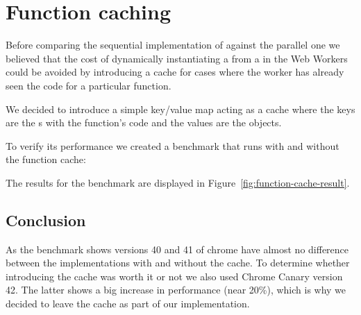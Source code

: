 \section{Function caching}

Before comparing the sequential implementation of  against the parallel one we believed that the cost of dynamically instantiating a \tfunction{} from a \tstring{} in the Web Workers could be avoided by introducing a cache for cases where the worker has already seen the code for a particular function.

We decided to introduce a simple key/value map acting as a cache where the keys are the \tstring{}s with the function's code and the values are the \tfunction{} objects.

To verify its performance we created a benchmark that runs with and without the function cache:

The results for the benchmark are displayed in Figure~\ref{fig:function-cache-result}.

\subsection{Conclusion}
As the benchmark shows versions 40 and 41 of chrome have almost no difference between the implementations with and without the cache. To determine whether introducing the cache was worth it or not we also used Chrome Canary version 42. The latter shows a big increase in performance (near 20\%), which is why we decided to leave the \tfunction{} cache as part of our implementation.

\pagebreak